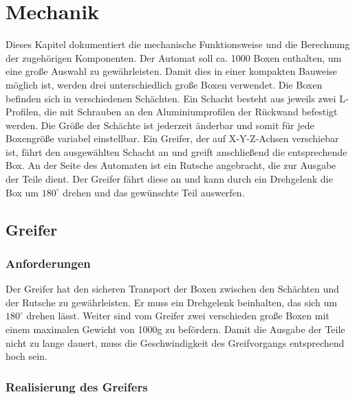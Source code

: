 


\section{Mechanik}


Dieses Kapitel dokumentiert die mechanische Funktionsweise und die Berechnung der zugehörigen Komponenten. Der Automat soll ca. 1000 Boxen enthalten, um eine große Auswahl zu gewährleisten. Damit dies in einer kompakten Bauweise möglich ist, werden drei unterschiedlich große Boxen verwendet. Die Boxen befinden sich in verschiedenen Schächten. 
Ein Schacht besteht aus jeweils zwei L-Profilen, die mit Schrauben an den Aluminiumprofilen der Rückwand befestigt werden. Die Größe der Schächte ist jederzeit änderbar und somit für jede Boxengröße variabel einstellbar. Ein Greifer, der auf X-Y-Z-Achsen verschiebar ist, fährt den ausgewählten Schacht an und greift anschließend die entsprechende Box. An der Seite des Automaten ist ein Rutsche angebracht, die zur Ausgabe der Teile dient. Der Greifer fährt diese an und kann durch ein Drehgelenk die Box um $180^\circ$ drehen und das gewünschte Teil auswerfen.


\subsection{Greifer}

\subsubsection{Anforderungen}


Der Greifer hat den sicheren Transport der Boxen zwischen den Schächten und der Rutsche zu gewährleisten. Er muss ein Drehgelenk beinhalten, das sich um $180^\circ$ drehen lässt. Weiter sind vom Greifer zwei verschieden große Boxen mit einem maximalen Gewicht von 1000g zu befördern. Damit die Ausgabe der Teile nicht zu lange dauert, muss die Geschwindigkeit des Greifvorgangs entsprechend hoch sein.


\subsubsection{Realisierung des Greifers}

